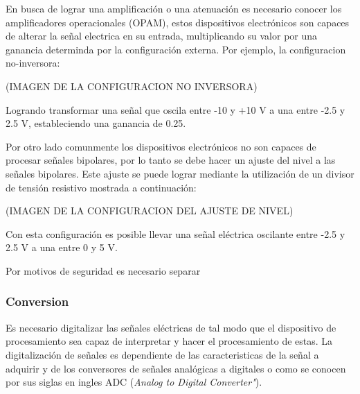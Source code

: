       \par En busca de lograr una amplificación o una atenuación es necesario conocer
      los amplificadores operacionales (OPAM), estos dispositivos electrónicos son capaces
      de alterar la señal electrica en su entrada, multiplicando su valor por una ganancia
      determinda por la configuración externa. Por ejemplo, la configuracion no-inversora:

      (IMAGEN DE LA CONFIGURACION NO INVERSORA)

      \par Logrando transformar una señal que oscila entre -10 y +10 V a una entre -2.5 y 2.5 V, estableciendo una ganancia de 0.25.

      \par Por otro lado comunmente los dispositivos electrónicos no son capaces de procesar
      señales bipolares, por lo tanto se debe hacer un ajuste del nivel a las señales bipolares.
      Este ajuste se puede lograr mediante la utilización de un divisor de tensión resistivo
      mostrada a continuación:

      (IMAGEN DE LA CONFIGURACION DEL AJUSTE DE NIVEL)

      \par Con esta configuración es posible llevar una señal eléctrica oscilante entre -2.5 y 2.5 V a una entre 0 y 5 V.

      \par Por motivos de seguridad es necesario separar

    \subsubsection{Conversion}
      \par Es necesario digitalizar las señales eléctricas de tal modo que el dispositivo de procesamiento sea capaz de interpretar y hacer el procesamiento de estas. La digitalización de señales es dependiente de las caracteristicas de la señal a adquirir y de los conversores de señales analógicas a digitales o como se conocen por sus siglas en ingles ADC (\textit{Analog to Digital Converter"}).

